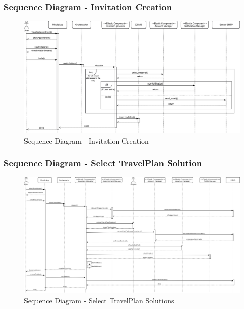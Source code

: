 	\subsubsection{Sequence Diagram - Invitation Creation}
		\begin{figure}[H]
			\centerline{\includegraphics[width=0.9\paperwidth]{Images/SD_InvitationCreation}}
			\caption{Sequence Diagram - Invitation Creation}
		\end{figure}
	\subsubsection{Sequence Diagram - Select TravelPlan Solution}
		\label{sect:Select TravelPlan Solution}
		\begin{figure}[H]
			\centerline{\includegraphics[width=0.9\paperwidth]{Images/selectTravelSolution}}
			\caption{Sequence Diagram - Select TravelPlan Solutions}
		\end{figure}

